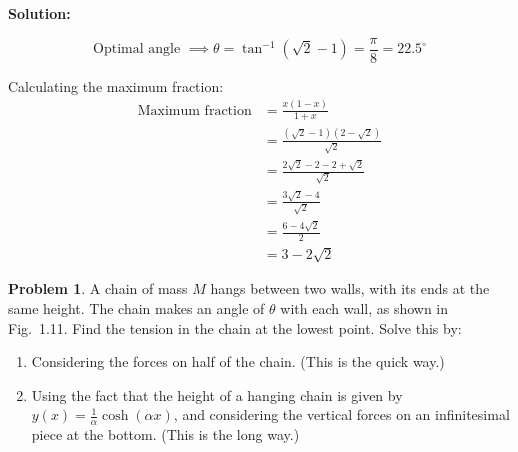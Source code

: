 \documentclass{article}
\theoremstyle{definition}
\newtheorem{problem}{Problem}
\newenvironment{solution}
  {\par\vspace{0.5em}\noindent\textbf{Solution:}\par\nopagebreak\vspace{0.3em}}
  {\par\vspace{1em}}
\begin{document}
\begin{solution}
    $$\text{Optimal angle } \implies \theta = \tan^{-1}(\sqrt{2} - 1) = \frac{\pi}{8} = 22.5^\circ$$
    
    Calculating the maximum fraction:
    \begin{align*}
        \text{Maximum fraction} &= \frac{x(1 - x)}{1 + x} \\
        &= \frac{(\sqrt{2} - 1)(2 - \sqrt{2})}{\sqrt{2}} \\
        &= \frac{2\sqrt{2} - 2 - 2 + \sqrt{2}}{\sqrt{2}} \\
        &= \frac{3\sqrt{2} - 4}{\sqrt{2}} \\
        &= \frac{6 - 4\sqrt{2}}{2} \\
        &= 3 - 2\sqrt{2}
    \end{align*}
\end{solution}
\begin{problem}
    \begin{minipage}[c]{0.66\textwidth}
        A chain of mass $M$ hangs between two walls, with its ends at the same height. The chain makes an angle of $\theta$ with each wall, as shown in Fig.~1.11. Find the tension in the chain at the lowest point. Solve this by:
        \begin{enumerate}
            \item[(a)] Considering the forces on half of the chain. (This is the quick way.)
            \item[(b)] Using the fact that the height of a hanging chain is given by $y(x) = \frac{1}{\alpha}\cosh(\alpha x)$, and considering the vertical forces on an infinitesimal piece at the bottom. (This is the long way.)
        \end{enumerate}
    \end{minipage}
    \hfill
    \begin{minipage}[c]{0.30\textwidth}
        \centering
    \end{minipage}
\end{problem}
\end{document}
